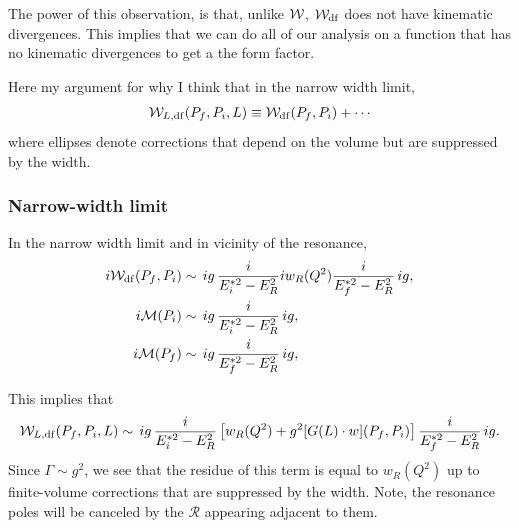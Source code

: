 The power of this observation, is that, unlike ${\mathcal{W}}$, ${\mathcal{W}}_{\rm df}$ does not have kinematic divergences. This implies that we can do all of our analysis on a function that has no kinematic divergences to get a the form factor. 



 Here my argument for why I think that in the narrow width limit, 
\begin{align}
 {\mathcal{W}}_{L,{\rm df}}(P_f,P_i,L)  \equiv {\mathcal{W}}_{\rm df}(P_f,P_i)+\cdots
\end{align}
where ellipses denote corrections that depend on the volume but are suppressed by the width. 

 \subsubsection{Narrow-width limit}

In the narrow width limit and in vicinity of the resonance, 
\begin{align}
i{\mathcal{W}}_{\rm df}(P_f,P_i)
&\sim
 \,{ig}\,\frac{i}{E_i^{*2}-E_R^2} iw_R(Q^2)\frac{i}{E_f^{*2}-E_R^2}\,{ig},\\
 i\mathcal M(P_i) 
&\sim
 \,{ig}\,\frac{i}{E_i^{*2}-E_R^2} \,{ig},
\\
i \mathcal M(P_f) 
&\sim
 \,{ig}\,\frac{i}{E_f^{*2}-E_R^2}\,{ig},
\end{align}

This implies that 
 \begin{equation}
\label{eq:WtiltoWdf}
 {\mathcal{W}}_{L,{\rm df}}(P_f,P_i,L)  \sim
  \,{ig}\,\frac{i}{E_i^{*2}-E_R^2} \left[ w_R(Q^2)+g^2[G(L) \cdot w](P_f,P_i)\right]\frac{i}{E_f^{*2}-E_R^2}\,{ig}.\\
 \end{equation}
 Since $\Gamma\sim g^2$, we see that the residue of this term is equal to $w_R(Q^2)$ up to finite-volume corrections that are suppressed by the width. Note, the resonance poles will be canceled by the $\mathcal{R}$ appearing adjacent to them.
 
